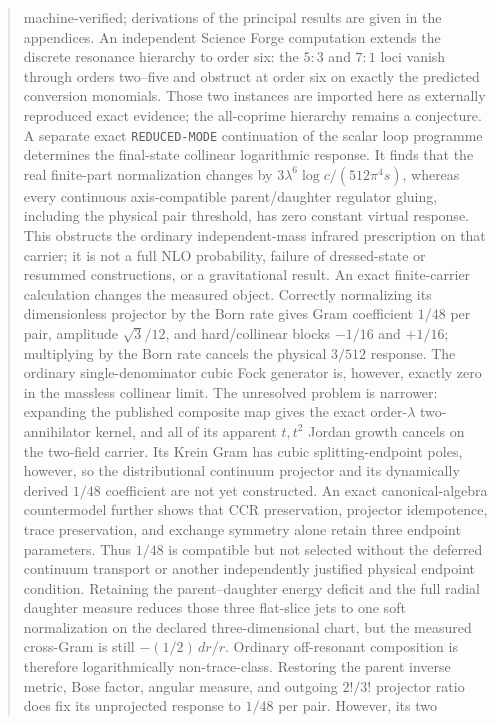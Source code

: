 \documentclass[11pt]{article}
\theoremstyle{definition}
\theoremstyle{remark}
\begin{document}
\begin{abstract}
machine-verified; derivations of the principal results are given in the
appendices.
An independent Science Forge computation extends the discrete
resonance hierarchy to order six: the $5{:}3$ and $7{:}1$ loci vanish through
orders two--five and obstruct at order six on exactly the predicted conversion
monomials.  Those two instances are imported here as externally reproduced
exact evidence; the all-coprime hierarchy remains a conjecture.
A separate exact \texttt{REDUCED-MODE} continuation of the scalar loop
programme determines the final-state collinear logarithmic response.  It
finds that the real finite-part normalization changes by
$3\lambda^6\log c/(512\pi^4s)$, whereas every continuous axis-compatible
parent/daughter regulator gluing, including the physical pair threshold, has
zero constant virtual response.  This obstructs the ordinary independent-mass
infrared prescription on that carrier; it is not a full NLO probability,
failure of dressed-state or resummed constructions, or a gravitational result.
An exact finite-carrier calculation changes the measured object.  Correctly
normalizing its dimensionless projector by the Born rate gives Gram coefficient
$1/48$ per pair, amplitude $\sqrt3/12$, and hard/collinear blocks
$-1/16$ and $+1/16$; multiplying by the Born rate cancels the physical
$3/512$ response.  The ordinary single-denominator cubic Fock generator is,
however, exactly zero in the massless collinear limit.  The unresolved problem
is narrower: expanding the published composite map gives the exact
order-$\lambda$ two-annihilator kernel, and all of its apparent $t,t^2$
Jordan growth cancels on the two-field carrier.  Its Krein Gram has cubic
splitting-endpoint poles, however, so the distributional continuum projector
and its dynamically derived $1/48$ coefficient are not yet constructed.  An
exact canonical-algebra countermodel further shows that CCR preservation,
projector idempotence, trace preservation, and exchange symmetry alone retain
three endpoint parameters.  Thus $1/48$ is compatible but not selected without
the deferred continuum transport or another independently justified physical
endpoint condition.  Retaining the parent--daughter energy deficit and the full
radial daughter measure reduces those three flat-slice jets to one soft
normalization on the declared three-dimensional chart, but the measured
cross-Gram is still $-(1/2)\,dr/r$.  Ordinary off-resonant composition is
therefore logarithmically non-trace-class.  Restoring the parent inverse
metric, Bose factor, angular measure, and outgoing $2!/3!$ projector ratio
does fix its unprojected response to $1/48$ per pair.  However, its two

\end{abstract}
\end{document}
